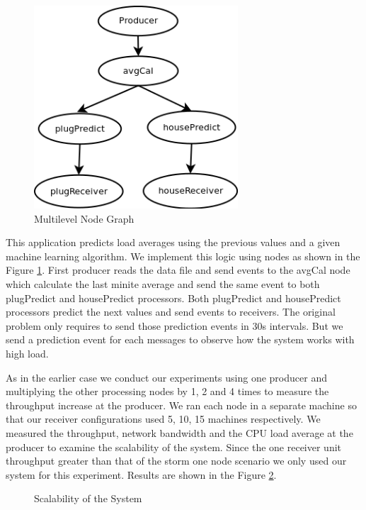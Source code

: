 \begin{figure}[!t]
        \centering
        \includegraphics[width=3.0in]{multigraph.png}
        \caption{Multilevel Node Graph}
        \label{multigraph}
\end{figure}

This application predicts load averages using the previous values and a given machine learning algorithm. We implement this logic using nodes as shown in the Figure \ref{multigraph}. First producer reads the data file and send events to the avgCal node which calculate the last minite average and send the same event to both plugPredict and housePredict processors. Both plugPredict and housePredict processors predict the next values and send events to receivers. The original problem only requires to send those prediction events in 30s intervals. But we send a prediction event for each messages to observe how the system works with high load.
 
As in the earlier case we conduct our experiments using one producer and multiplying the other processing nodes by 1, 2 and 4 times to measure the throughput increase at the producer. We ran each node in a separate machine so that our receiver configurations used 5, 10, 15 machines respectively. We measured the throughput,  network bandwidth and the CPU load average at the producer to examine the scalability of the system. Since the one receiver unit throughput greater than that of the storm one node scenario we only used our system for this experiment.  Results are shown in the Figure \ref{scalability}.


\begin{figure}[!t]
        \centering
        \hfil
        \hfil
        \hfil
        \caption{Scalability of the System}
        \label{scalability}
\end{figure}


